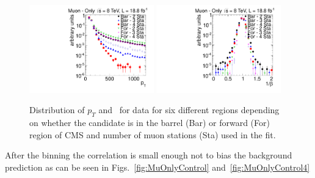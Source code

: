 \begin{figure}
\centering
  \includegraphics[clip=false, trim=0.0cm 0cm 0.0cm 0cm, width=0.48\textwidth]{figures/muonly/Selection_Data8TeV_Pt_Binned_BS}
  \includegraphics[clip=false, trim=0.0cm 0cm 0.0cm 0cm, width=0.48\textwidth]{figures/muonly/Selection_Data8TeV_TOF_Binned_BS}
\caption[Distribution of $p_T$ and \invbeta\ for data in different prediction regions in the \muononly\ analysis]
{Distribution of $p_T$ and \invbeta\ for data for six different regions depending on whether the candidate is in the barrel (Bar)
or forward (For) region of CMS and number of muon stations (Sta) used in the fit.}
    \label{fig:SelVarBinned}
\end{figure}

After the binning the correlation is small enough not to bias the background prediction as can be seen in Figs.~\ref{fig:MuOnlyControl} and~\ref{fig:MuOnlyControl4}

